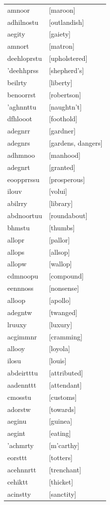 \documentclass{article}
\begin{document}
\begin{tabular}{ll}
amnoor & [maroon] \\
adhilnostu & [outlandish] \\
aegity & [gaiety] \\
amnort & [matron] \\
deehloprstu & [upholstered] \\
'deehhprss & [shepherd's] \\
beilrty & [liberty] \\
benoorrst & [robertson] \\
'aghnnttu & [naughtn't] \\
dfhlooot & [foothold] \\
adegnrr & [gardner] \\
adegnrs & [gardens, dangers] \\
adhmnoo & [manhood] \\
adegnrt & [granted] \\
eoopprrssu & [prosperous] \\
ilouv & [volui] \\
abilrry & [library] \\
abdnoortuu & [roundabout] \\
bhmstu & [thumbs] \\
allopr & [pallor] \\
allops & [allsop] \\
allopw & [wallop] \\
cdmnoopu & [compound] \\
eennnoss & [nonsense] \\
alloop & [apollo] \\
adegntw & [twanged] \\
lruuxy & [luxury] \\
acgimmnr & [cramming] \\
allooy & [loyola] \\
ilosu & [louis] \\
abdeirtttu & [attributed] \\
aadennttt & [attendant] \\
cmosstu & [customs] \\
adorstw & [towards] \\
aeginu & [guinea] \\
aegint & [eating] \\
'achmrty & [m'carthy] \\
eorsttt & [totters] \\
acehnnrtt & [trenchant] \\
cehiktt & [thicket] \\
acinstty & [sanctity] \\

\end{tabular}
\end{document}
